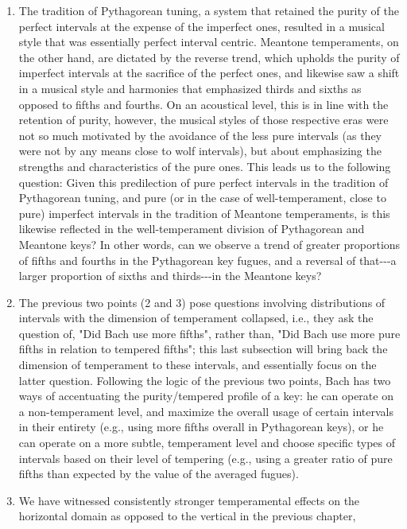 \begin{enumerate}
\item
  The tradition of Pythagorean tuning, a system that retained the purity
  of the perfect intervals at the expense of the imperfect ones,
  resulted in a musical style that was essentially perfect interval
  centric. Meantone temperaments, on the other hand, are dictated by the
  reverse trend, which upholds the purity of imperfect intervals at the
  sacrifice of the perfect ones, and likewise saw a shift in a musical
  style and harmonies that emphasized thirds and sixths as opposed to
  fifths and fourths. On an acoustical level, this is in line with the
  retention of purity, however, the musical styles of those respective
  eras were not so much motivated by the avoidance of the less pure
  intervals (as they were not by any means close to wolf intervals), but
  about emphasizing the strengths and characteristics of the pure ones.
  This leads us to the following question: Given this predilection of
  pure perfect intervals in the tradition of Pythagorean tuning, and
  pure (or in the case of well-temperament, close to pure) imperfect
  intervals in the tradition of Meantone temperaments, is this likewise
  reflected in the well-temperament division of Pythagorean and Meantone
  keys? In other words, can we observe a trend of greater proportions of
  fifths and fourths in the Pythagorean key fugues, and a reversal of
  that-\/-\/-a larger proportion of sixths and thirds-\/-\/-in the
  Meantone keys?
\item
  The previous two points (2 and 3) pose questions involving
  distributions of intervals with the dimension of temperament
  collapsed, i.e., they ask the question of, "Did Bach use more fifths",
  rather than, "Did Bach use more pure fifths in relation to tempered
  fifths"; this last subsection will bring back the dimension of
  temperament to these intervals, and essentially focus on the latter
  question. Following the logic of the previous two points, Bach has two
  ways of accentuating the purity/tempered profile of a key: he can
  operate on a non-temperament level, and maximize the overall usage of
  certain intervals in their entirety (e.g., using more fifths overall
  in Pythagorean keys), or he can operate on a more subtle, temperament
  level and choose specific types of intervals based on their level of
  tempering (e.g., using a greater ratio of pure fifths than expected by
  the value of the averaged fugues).
\item
  We have witnessed consistently stronger temperamental effects on the
  horizontal domain as opposed to the vertical in the previous chapter,

\end{enumerate}
